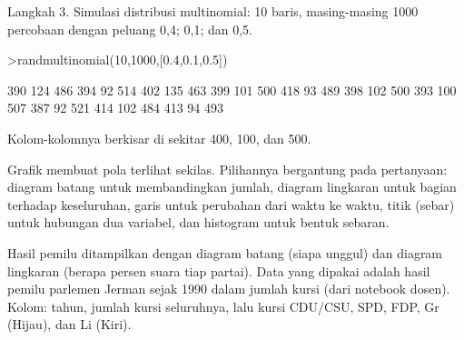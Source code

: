 \documentclass[a4paper,10pt]{article}
\begin{document}
\begin{eulernotebook}
\begin{eulercomment}
\begin{eulercomment}
\begin{eulercomment}
\begin{eulercomment}
\begin{eulercomment}
\begin{eulercomment}
\begin{eulercomment}
\begin{eulercomment}
\begin{eulercomment}
\begin{eulercomment}
\begin{eulercomment}
\begin{eulercomment}
\begin{eulercomment}
Langkah 3. Simulasi distribusi multinomial: 10 baris, masing-masing 1000 percobaan dengan
peluang 0,4; 0,1; dan 0,5.
\end{eulercomment}
\begin{eulerprompt}
>randmultinomial(10,1000,[0.4,0.1,0.5])
\end{eulerprompt}
\begin{euleroutput}
        390       124       486 
        394        92       514 
        402       135       463 
        399       101       500 
        418        93       489 
        398       102       500 
        393       100       507 
        387        92       521 
        414       102       484 
        413        94       493 
\end{euleroutput}
\begin{eulercomment}
Kolom-kolomnya berkisar di sekitar 400, 100, dan 500.

\begin{eulercomment}
\begin{eulercomment}
\end{eulercomment}
\begin{eulercomment}
Grafik membuat pola terlihat sekilas. Pilihannya bergantung pada pertanyaan: diagram
batang untuk membandingkan jumlah, diagram lingkaran untuk bagian terhadap keseluruhan,
garis untuk perubahan dari waktu ke waktu, titik (sebar) untuk hubungan dua variabel, dan
histogram untuk bentuk sebaran.

\end{eulercomment}
\begin{eulercomment}
Hasil pemilu ditampilkan dengan diagram batang (siapa unggul) dan diagram lingkaran (berapa
persen suara tiap partai). Data yang dipakai adalah hasil pemilu parlemen Jerman sejak 1990
dalam jumlah kursi (dari notebook dosen). Kolom: tahun, jumlah kursi seluruhnya, lalu kursi
CDU/CSU, SPD, FDP, Gr (Hijau), dan Li (Kiri).


\end{eulercomment}
\end{eulercomment}
\end{eulercomment}
\end{eulercomment}
\end{eulercomment}
\end{eulercomment}
\end{eulercomment}
\end{eulercomment}
\end{eulercomment}
\end{eulercomment}
\end{eulercomment}
\end{eulercomment}
\end{eulercomment}
\end{eulercomment}
\end{eulercomment}
\end{eulernotebook}
\end{document}
